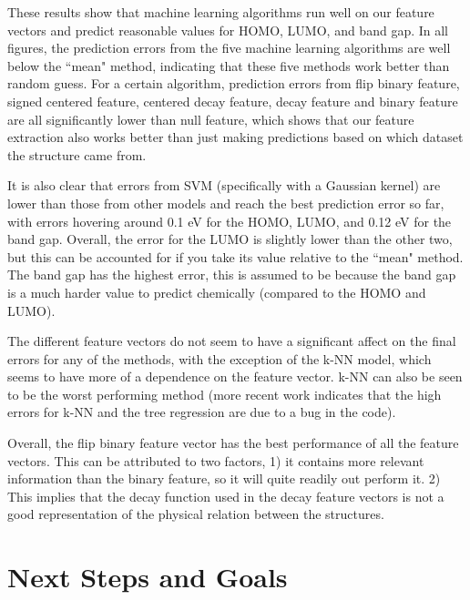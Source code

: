 \documentclass[12pt, oneside]{article}   	%
\begin{document}
These results show that machine learning algorithms run well on our feature vectors and predict reasonable values for HOMO, LUMO, and band gap. In all figures, the prediction errors from the five machine learning algorithms are well below the ``mean" method, indicating that these five methods work better than random guess. For a certain algorithm, prediction errors from flip binary feature, signed centered feature, centered decay feature, decay feature and binary feature are all significantly lower than null feature, which shows that our feature extraction also works better than just making predictions based on which dataset the structure came from.


It is also clear that errors from SVM (specifically with a Gaussian kernel) are lower than those from other models and reach the best prediction error so far, with errors hovering around 0.1 eV for the HOMO, LUMO, and 0.12 eV for the band gap. Overall, the error for the LUMO is slightly lower than the other two, but this can be accounted for if you take its value relative to the ``mean" method. The band gap has the highest error, this is assumed to be because the band gap is a much harder value to predict chemically (compared to the HOMO and LUMO). 

The different feature vectors do not seem to have a significant affect on the final errors for any of the methods, with the exception of the k-NN model, which seems to have more of a dependence on the feature vector. k-NN can also be seen to be the worst performing method (more recent work indicates that the high errors for k-NN and the tree regression are due to a bug in the code).

Overall, the flip binary feature vector has the best performance of all the feature vectors. This can be attributed to two factors, 1) it contains more relevant information than the binary feature, so it will quite readily out perform it. 2) This implies that the decay function used in the decay feature vectors is not a good representation of the physical relation between the structures.

\section{Next Steps and Goals}


\end{document}

